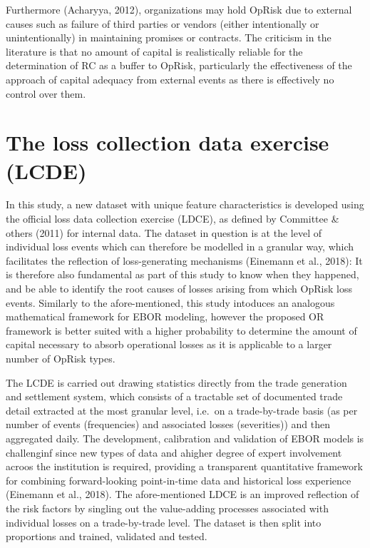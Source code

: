 \documentclass{DissertateUSU}
\begin{document}
Furthermore (Acharyya, 2012), organizations may hold OpRisk due to
external causes such as failure of third parties or vendors (either
intentionally or unintentionally) in maintaining promises or contracts.
The criticism in the literature is that no amount of capital is
realistically reliable for the determination of RC as a buffer to
OpRisk, particularly the effectiveness of the approach of capital
adequacy from external events as there is effectively no control over
them.\medskip

\section{The loss collection data exercise (LCDE)}
\label{sec:The loss collection data exercise (LCDE)}

In this study, a new dataset with unique feature characteristics is
developed using the official loss data collection exercise (LDCE), as
defined by Committee \& others (2011) for internal data. The dataset in
question is at the level of individual loss events which can therefore
be modelled in a granular way, which facilitates the reflection of
loss-generating mechanisms (Einemann et al., 2018): It is therefore also
fundamental as part of this study to know when they happened, and be
able to identify the root causes of losses arising from which OpRisk
loss events. Similarly to the afore-mentioned, this study intoduces an
analogous mathematical framework for EBOR modeling, however the proposed
OR framework is better suited with a higher probability to determine the
amount of capital necessary to absorb operational losses as it is
applicable to a larger number of OpRisk types.\medskip

The LCDE is carried out drawing statistics directly from the trade
generation and settlement system, which consists of a tractable set of
documented trade detail extracted at the most granular level, i.e.~on a
trade-by-trade basis (as per number of events (frequencies) and
associated losses (severities)) and then aggregated daily. The
development, calibration and validation of EBOR models is challenginf
since new types of data and ahigher degree of expert involvement acroos
the institution is required, providing a transparent quantitative
framework for combining forward-looking point-in-time data and
historical loss experience (Einemann et al., 2018). The afore-mentioned
LDCE is an improved reflection of the risk factors by singling out the
value-adding processes associated with individual losses on a
trade-by-trade level. The dataset is then split into proportions and
trained, validated and tested.
\end{document}

